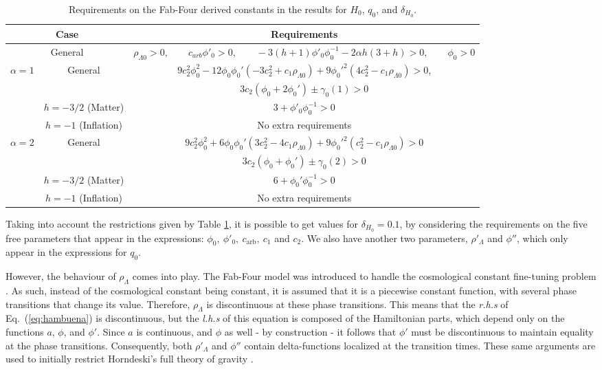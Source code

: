 \documentclass[onecolumn,superscriptaddress,secnumarabic,amssymb,amsmath,nobibnotes,aps,prd,nofootinbib,altaffilletter]{revtex4}
\begin{document}
\begin{table}[t]
    \centering
    \begin{tabular}{|c|c|c|}
        \hline
         \multicolumn{2}{|c|}{\textbf{Case}} & \textbf{Requirements} \\ \hline
         \multicolumn{2}{|c|}{General} & $\rho_{\Lambda 0}>0, \qquad c_{arb}\phi'_0>0, \qquad -3(h+1)\phi'_0 \phi_0^{-1} - 2\alpha h(3+h)>0, \qquad \phi_0 >0$ \\ \hline
         \multirow{4}{*}{$\alpha=1$} & \multirow{2}{*}{General} & $9c_2^2\phi_0^2-12\phi_0\phi_0'(-3c_2^2+c_1\rho_{\Lambda 0}) + 9{\phi_0'}^2(4c_2^2-c_1\rho_{\Lambda 0})>0$, \\
          &  & $3c_2(\phi_0 + 2\phi_0') \pm \gamma_0(1)>0$\\ \cline{2-3}
          & $h=-3/2$ (Matter) & $3+\phi'_0\phi^{-1}_0>0$ \\ \cline{2-3}
          & $h=-1$ (Inflation) & No extra requirements \\ \hline
         \multirow{4}{*}{$\alpha=2$} & \multirow{2}{*}{General} & $9c_2^2\phi_0^2 + 6\phi_0 \phi_0'(3c_2^2-4c_1\rho_{\Lambda 0}) + 9{\phi_0'}^2(c_2^2-c_1\rho_{\Lambda 0})>0$ \\
         & & $3c_2(\phi_0 + \phi_0') \pm \gamma_0(2) >0$\\ \cline{2-3}
         & $h=-3/2$ (Matter) & $6+\phi_0' \phi_0^{-1}>0$ \\ \cline{2-3}
         & $h=-1$ (Inflation) & No extra requirements \\ \hline
    \end{tabular}
    \caption{Requirements on the Fab-Four derived constants in the results for $H_0$, $q_0$, and $\delta_{H_0}$.}
    \label{tab:requirements}
\end{table}

Taking into account the restrictions given by Table \ref{tab:requirements}, it is possible to get values for $\delta_{H_0}=0.1$, by considering the requirements on the five free parameters that appear in the expressions: $\phi_0, \: \phi'_0, \: c_{\text{arb}}, \: c_1$ and $c_2$. We also have another two parameters, $\rho'_\Lambda$ and $\phi''$, which only appear in the expressions for $q_0$. 

However, the behaviour of $\rho_{\Lambda}$ comes into play. The Fab-Four model was introduced to handle the cosmological constant fine-tuning problem \cite{Charmousis_2012,Copeland:2012qf}. As such, instead of the cosmological constant being constant, it is assumed that it is a piecewise constant function, with several phase transitions that change its value. Therefore, $\rho_{\Lambda}$ is discontinuous at these phase transitions. This means that the \textit{r.h.s} of Eq.~(\ref{eq:hambuena}) is discontinuous, but the \textit{l.h.s} of this equation is composed of the Hamiltonian parts, which depend only on the functions $a$, $\phi$, and $\phi'$. Since $a$ is continuous, and $\phi$ as well - by construction - it follows that $\phi'$ must be discontinuous to maintain equality at the phase transitions. Consequently, both $\rho'_\Lambda$ and $\phi''$ contain delta-functions localized at the transition times. These same arguments are used to initially restrict Horndeski's full theory of gravity \cite{Charmousis_2012}.
\end{document}
